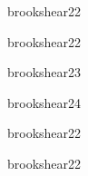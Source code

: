 \begin{syllabus}
\begin{unit}{\PFFundamentalDataStructuresDef}{brookshear}{2}{2}
    \PFFundamentalDataStructuresAllTopics
    \PFFundamentalDataStructuresAllObjectives
\end{unit}

\begin{unit}{\ALBasicAnalysisDef}{brookshear}{2}{2}
   \begin{topics}
      \item \ALBasicAnalysisTopicIdentifying
   \end{topics}

   \begin{learningoutcomes}
      \item \ALBasicAnalysisObjTHREE
   \end{learningoutcomes}
\end{unit}

\begin{unit}{\ALAlgoritmicStrategiesDef}{brookshear}{2}{3}
   \begin{topics}
      \item \ALAlgoritmicStrategiesTopicBrute
      \item \ALAlgoritmicStrategiesTopicDivide
   \end{topics}

   \begin{learningoutcomes}
      \item \ALAlgoritmicStrategiesObjONE
      \item \ALAlgoritmicStrategiesObjFOUR
   \end{learningoutcomes}
\end{unit}

\begin{unit}{\ARDigitalLogicAndDataRepresentationDef}{brookshear}{2}{4}
    \ARDigitalLogicAndDataRepresentationAllTopics
    \ARDigitalLogicAndDataRepresentationAllObjectives
\end{unit}

\begin{unit}{\ARComputerArchitectureOrganizationDef}{brookshear}{2}{2}
    \ARComputerArchitectureOrganizationAllTopics
    \ARComputerArchitectureOrganizationAllObjectives
\end{unit}

\begin{unit}{\ARMemoryArchitectureDef}{brookshear}{2}{2}
    \ARMemoryArchitectureAllTopics
    \ARMemoryArchitectureAllObjectives
\end{unit}


\end{syllabus}
